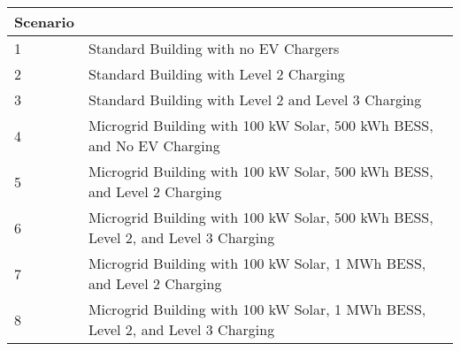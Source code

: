 \begin{tabularx}{\linewidth}{l | l}
\toprule
 Scenario &  \\
\midrule
		1  & Standard Building with no EV Chargers\\
        2 & Standard Building with Level 2 Charging\\
        3 & Standard Building with Level 2 and Level 3 Charging \\
        4 &  Microgrid Building with 100 kW Solar, 500 kWh BESS, and No EV Charging\\
        5 & Microgrid Building with 100 kW Solar, 500 kWh BESS,  and Level 2 Charging\\
        6 & Microgrid Building with 100 kW Solar, 500 kWh BESS, Level 2, and Level 3 Charging\\
        7 & Microgrid Building with 100 kW Solar, 1 MWh BESS, and Level 2 Charging\\
        8 & Microgrid Building with 100 kW Solar, 1 MWh BESS, Level 2, and Level 3 Charging\\
\bottomrule
\end{tabularx}
